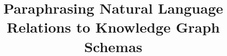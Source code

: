 \documentclass{acm_proc_article-sp}
\begin{document}
\title{Paraphrasing Natural Language Relations to Knowledge Graph Schemas
}
%
%
%
%
%
\end{document}

